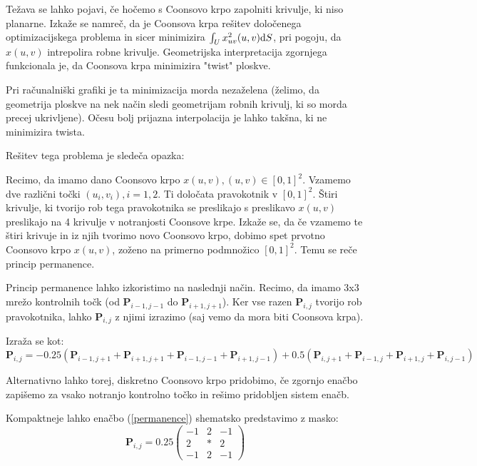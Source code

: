 \documentclass{article}
\begin{document}
Težava se lahko pojavi, če hočemo s Coonsovo krpo zapolniti krivulje, ki niso planarne.
Izkaže se namreč, da je Coonsova krpa rešitev določenega optimizacijskega problema in sicer
minimizira $\int_U x_{uv}^2(u,v) \textup{d}S$, pri pogoju, da $x(u,v)$ intrepolira robne krivulje.
Geometrijska interpretacija zgornjega funkcionala je, da Coonsova krpa minimizira "twist" ploskve.

Pri računalniški grafiki je ta minimizacija morda nezaželena (želimo, da geometrija ploskve na nek način sledi geometrijam robnih krivulj, ki so morda precej ukrivljene). Očesu bolj prijazna interpolacija je lahko takšna, ki ne minimizira twista.

Rešitev tega problema je sledeča opazka:

Recimo, da imamo dano Coonsovo krpo $x(u,v), (u,v) \in [0,1]^2$. Vzamemo dve različni točki $(u_i, v_i), i=1,2$. Ti določata pravokotnik v $[0,1]^2$. Štiri krivulje, ki tvorijo rob tega pravokotnika se preslikajo s preslikavo $x(u,v)$ preslikajo na 4 krivulje v notranjosti Coonsove krpe. Izkaže se, da če vzamemo te štiri krivuje in iz njih tvorimo novo Coonsovo krpo, dobimo spet prvotno Coonsovo krpo $x(u,v)$, zoženo na primerno podmnožico $[0,1]^2$. Temu se reče princip permanence.

Princip permanence lahko izkoristimo na naslednji način. Recimo, da imamo 3x3 mrežo kontrolnih točk (od $\textbf{P}_{i-1,j-1}$ do $\textbf{P}_{i+1,j+1}$).
Ker vse razen $\textbf{P}_{i,j}$ tvorijo rob pravokotnika, lahko $\textbf{P}_{i,j}$ z njimi izrazimo (saj vemo da mora biti Coonsova krpa).

Izraža se kot:
\begin{equation}
\textbf{P}_{i,j} = -0.25 (\textbf{P}_{i-1,j+1} + \textbf{P}_{i+1,j+1} + \textbf{P}_{i-1,j-1} + \textbf{P}_{i+1,j-1}) + 0.5 (\textbf{P}_{i,j+1} + \textbf{P}_{i-1,j} + \textbf{P}_{i+1,j} + \textbf{P}_{i,j-1})
\label{permanence}
\end{equation}

Alternativno lahko torej, diskretno Coonsovo krpo pridobimo, če zgornjo enačbo zapišemo za vsako notranjo kontrolno točko in rešimo pridobljen sistem enačb.

Kompaktneje lahko enačbo (\ref{permanence}) shematsko predstavimo z masko:
\begin{equation}
\textbf{P}_{i,j} = 0.25 \begin{pmatrix} -1  & 2 & -1 \\ 2 & * & 2 \\ -1 & 2 & -1\end{pmatrix}
\end{equation}
\end{document}
